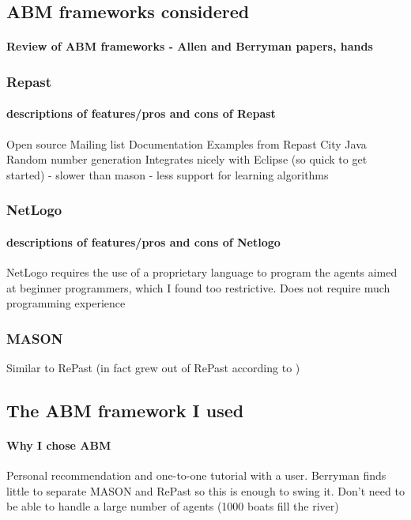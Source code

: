     \subsection{ABM frameworks considered}
      \paragraph{Review of ABM frameworks - Allen and Berryman papers, hands}
      \subsubsection{Repast}
        \paragraph{descriptions of features/pros and cons of Repast}
        Open source
        Mailing list
        Documentation
        Examples from Repast City
        Java
        Random number generation
        Integrates nicely with Eclipse (so quick to get started)
        - slower than mason
        - less support for learning algorithms
      \subsubsection{NetLogo}
        \paragraph{descriptions of features/pros and cons of Netlogo}
        NetLogo requires the use of a proprietary
        language to program the agents aimed at beginner programmers, which I
        found too restrictive.
        Does not require much programming experience
        
      \subsubsection{MASON}
        Similar to RePast (in fact grew out of RePast according to )
    \subsection{The ABM framework I used}
      \paragraph{Why I chose ABM}
      Personal recommendation and one-to-one tutorial with a user. Berryman finds little to separate MASON and RePast so this is enough to swing it.
      Don't need to be able to handle a large number of agents (1000 boats fill the river)
      
